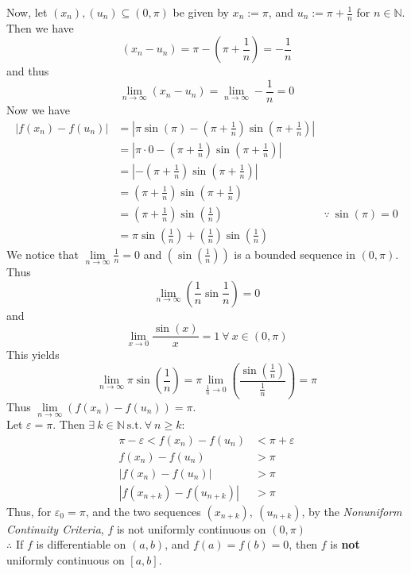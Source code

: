 \documentclass[12pt,letterpaper]{article}
\newcommand{\st}{\ \text{s.t.}\ }
\newcommand{\abs}[1]{\left\lvert #1 \right\rvert}
\newcommand{\N}{\mathbb{N}}
\theoremstyle{case}
\theoremstyle{definition}
\begin{document}
\begin{enumerate}
\begin{enumerate}
			Now, let $(x_n),(u_n) \subseteq (0,\pi)$ be given by $x_n:=\pi$, and $u_n:=\pi+\frac{1}{n}$ for $n \in \N$. Then we have
			\[(x_n-u_n)=\pi-(\pi+\frac{1}{n})=-\frac{1}{n}\]
			and thus
			\[\lim\limits_{n \to \infty} (x_n-u_n)=\lim\limits_{n \to \infty} -\frac{1}{n}=0\]
			Now we have
			\begin{align*}
				|f(x_n)-f(u_n)| &= \abs{\pi\sin(\pi)-\left(\pi+\frac{1}{n}\right)\sin(\pi+\frac{1}{n})} \\
				&= \abs{\pi \cdot 0-\left(\pi+\frac{1}{n}\right)\sin\left(\pi+\frac{1}{n}\right)} \\
				&= \abs{-\left(\pi+\frac{1}{n}\right)\sin\left(\pi+\frac{1}{n}\right)} \\
				&= \left(\pi+\frac{1}{n}\right)\sin\left(\pi+\frac{1}{n}\right) \\
				&= \left(\pi+\frac{1}{n}\right)\sin(\frac{1}{n}) &\because\ \sin(\pi)=0 \\
				&= \pi\sin\left(\frac{1}{n}\right)+\left(\frac{1}{n}\right)\sin\left(\frac{1}{n}\right)
			\end{align*}
			We notice that $\lim\limits_{n \to \infty} \frac{1}{n}=0$ and $(\sin\left(\frac{1}{n}\right))$ is a bounded sequence in $(0,\pi)$. Thus
			\[\lim\limits_{n \to \infty} \left(\frac{1}{n}\sin\frac{1}{n}\right)=0\]
			and
			\[\lim\limits_{x \to 0} \frac{\sin(x)}{x}=1\ \forall\ x \in (0,\pi)\]
			This yields
			\[\lim\limits_{n \to \infty} \pi\sin\left(\frac{1}{n}\right)=\pi\lim\limits_{\frac{1}{n}\to 0} \left(\frac{\sin\left(\frac{1}{n}\right)}{\frac{1}{n}}\right)=\pi\]
			Thus $\lim\limits_{n \to \infty} (f(x_n)-f(u_n))=\pi$.\\
			
			Let $\varepsilon=\pi$. Then $\exists\ k \in \N \st \forall\ n \geq k$:
			\begin{align*}
				\pi-\varepsilon<f(x_n)-f(u_n)&<\pi+\varepsilon \\
				f(x_n)-f(u_n)&>\pi \\
				|f(x_n)-f(u_n)|&>\pi \\
				|f(x_{n+k})-f(u_{n+k})|&>\pi
			\end{align*}
			Thus, for $\varepsilon_0=\pi$, and the two sequences $(x_{n+k}),\ (u_{n+k})$, by the \textit{Nonuniform Continuity Criteria}, $f$ is not uniformly continuous on $(0,\pi)$\\
			
			$\therefore$ If $f$ is differentiable on $(a,b)$, and $f(a)=f(b)=0$, then $f$ is \textbf{not} uniformly continuous on $[a,b]$.
		\end{enumerate}		
	\end{enumerate}
\end{document}
